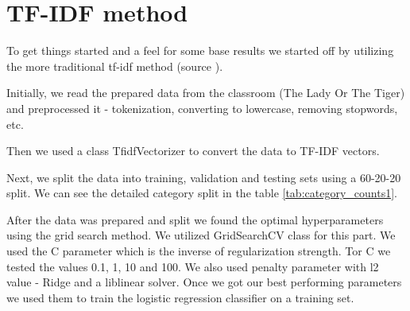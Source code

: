 \documentclass[fleqn,moreauthors,10pt]{ds_report}
\begin{document}
\section*{TF-IDF method}

To get things started and a feel for some base results we started off by utilizing the more traditional tf-idf method (source \cite{Anala2020}).

Initially, we read the prepared data from the classroom (The Lady Or The Tiger) and 
preprocessed it - tokenization, converting to lowercase, removing stopwords, etc. 

Then we used a class TfidfVectorizer to convert the data to TF-IDF vectors.

Next, we split the data into training, validation and testing sets using a 60-20-20 split. We can see the detailed category split in the table \ref{tab:category_counts1}.

\begin{table}[htbp]
    \centering
    \vspace{0.2cm}
    \caption{Category counts for train, validation, and test data}
    \label{tab:category_counts1}
\end{table}

After the data was prepared and split we found the optimal hyperparameters using the grid search method. We utilized GridSearchCV class for this part. We used the C parameter which is the inverse of regularization strength. Tor C we tested the values 0.1, 1, 10 and 100. We also used penalty parameter with l2 value - Ridge and a liblinear solver. Once we got our best performing parameters we used them to train the logistic regression classifier on a training set.
\end{document}
